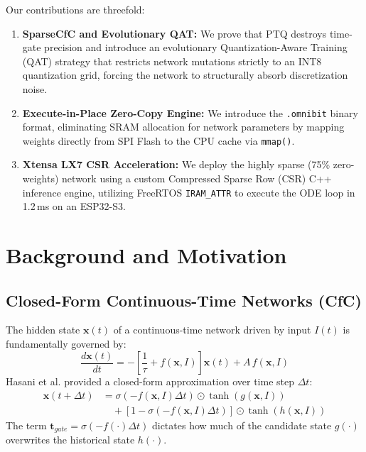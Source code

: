 \documentclass[lettersize,journal]{IEEEtran}
\begin{document}
Our contributions are threefold:
\begin{enumerate}
    \item \textbf{SparseCfC and Evolutionary QAT:} We prove that PTQ destroys time-gate precision and introduce an evolutionary Quantization-Aware Training (QAT) strategy that restricts network mutations strictly to an INT8 quantization grid, forcing the network to structurally absorb discretization noise.
    \item \textbf{Execute-in-Place Zero-Copy Engine:} We introduce the \texttt{.omnibit} binary format, eliminating SRAM allocation for network parameters by mapping weights directly from SPI Flash to the CPU cache via \texttt{mmap()}.
    \item \textbf{Xtensa LX7 CSR Acceleration:} We deploy the highly sparse (75\% zero-weights) network using a custom Compressed Sparse Row (CSR) C++ inference engine, utilizing FreeRTOS \texttt{IRAM\_ATTR} to execute the ODE loop in 1.2\,ms on an ESP32-S3.
\end{enumerate}

\section{Background and Motivation}

\subsection{Closed-Form Continuous-Time Networks (CfC)}
The hidden state $\mathbf{x}(t)$ of a continuous-time network driven by input $I(t)$ is fundamentally governed by:
\begin{equation}
  \frac{d\mathbf{x}(t)}{dt} = -\!\left[\frac{1}{\tau} + f(\mathbf{x}, I)\right]\mathbf{x}(t) + A\, f(\mathbf{x}, I)
\end{equation}
Hasani et al. \cite{hasani2022closed} provided a closed-form approximation over time step $\Delta t$:
\begin{equation}
\begin{aligned}
  \mathbf{x}(t+\Delta t) &= \sigma\!\left(-f(\mathbf{x}, I)\Delta t\right) \odot \tanh(g(\mathbf{x}, I)) \\
  &\quad + \left[1-\sigma\!\left(-f(\mathbf{x}, I)\Delta t\right)\right] \odot \tanh(h(\mathbf{x}, I))
\end{aligned}
  \label{eq:cfc_gate}
\end{equation}
The term $\mathbf{t}_{gate} = \sigma(-f(\cdot)\Delta t)$ dictates how much of the candidate state $g(\cdot)$ overwrites the historical state $h(\cdot)$. 
\end{document}
